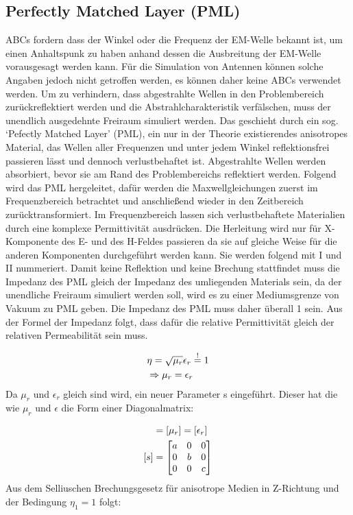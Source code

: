 \documentclass[11pt, ngerman]{article}
\begin{document}
\subsection{Perfectly Matched Layer (PML)}
ABCs fordern dass der Winkel oder die Frequenz der EM-Welle bekannt ist, um einen Anhaltspunk zu haben anhand dessen
die Ausbreitung der EM-Welle vorausgesagt werden kann.
F\"ur die Simulation von Antennen k\"onnen solche Angaben jedoch nicht getroffen werden, es k\"onnen daher keine ABCs verwendet werden. Um zu verhindern, dass abgestrahlte Wellen in den Problembereich zur\"uckreflektiert werden und die Abstrahlcharakteristik
verf\"alschen, muss der unendlich ausgedehnte Freiraum simuliert werden. Das geschieht durch ein sog. `Pefectly Matched Layer'
(PML), ein nur in der Theorie existierendes anisotropes Material, das Wellen aller Frequenzen und unter jedem
Winkel reflektionsfrei passieren l\"asst und dennoch verlustbehaftet ist\cite{introduction_pml}.
Abgestrahlte Wellen werden absorbiert, bevor sie am Rand des Problembereichs reflektiert werden.
Folgend wird das PML hergeleitet, daf\"ur werden die Maxwellgleichungen zuerst im Frequenzbereich betrachtet
und anschlie{\ss}end wieder in den Zeitbereich zur\"ucktransformiert\cite{derivation_pml}.
Im Frequenzbereich lassen sich verlustbehaftete Materialien durch eine komplexe Permittivit\"at ausdr\"ucken.\cite{loss_in_fd}
Die Herleitung wird nur f\"ur X-Komponente des E- und des H-Feldes passieren da sie auf gleiche Weise f\"ur die anderen Komponenten
durchgef\"uhrt werden kann. Sie werden folgend mit I und II nummeriert.
Damit keine Reflektion und keine Brechung stattfindet muss die Impedanz des PML gleich der Impedanz des umliegenden
Materials sein, da der unendliche Freiraum simuliert werden soll, wird es zu einer Mediumsgrenze von Vakuum zu PML
geben. Die Impedanz des PML muss daher \"uberall 1 sein.
Aus der Formel der Impedanz folgt, dass daf\"ur die relative Permittivit\"at gleich der relativen Permeabilit\"at sein muss.%
\cite{matched_impedance}

\begin{align}
	&\eta = \sqrt{\mu_r}{\epsilon_r} \stackrel{!}{=} 1\\
	&\Rightarrow \mu_r = \epsilon_r
\end{align}
Da \(\mu_r\) und \(\epsilon_r\) gleich sind wird, ein neuer Parameter s eingef\"uhrt.
Dieser hat die wie \(\mu_r\) und \(\epsilon\) die Form einer Diagonalmatrix:

\begin{align}
	[s] &= [\mu_r] = [\epsilon_r]\\
	[s] &= \dt{a}{b}{c}
\end{align}
Aus dem Selliuschen Brechungsgesetz f\"ur anisotrope Medien in Z-Richtung und der Bedingung \(\eta_1 = 1\) folgt:
\end{document}
